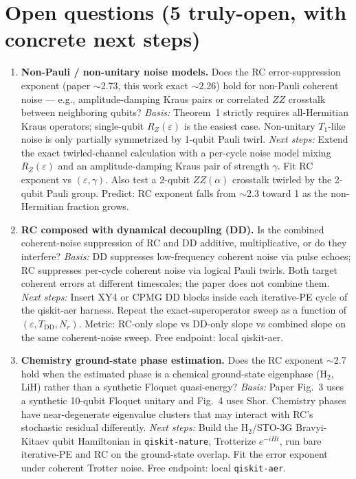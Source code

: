 \section*{Open questions (5 truly-open, with concrete next steps)}

\begin{enumerate}
  \item \textbf{Non-Pauli / non-unitary noise models.}
  Does the RC error-suppression exponent (paper $\sim$2.73, this work exact $\sim$2.26) hold for non-Pauli coherent noise --- e.g., amplitude-damping Kraus pairs or correlated $ZZ$ crosstalk between neighboring qubits?
  \emph{Basis:} Theorem~1 strictly requires all-Hermitian Kraus operators; single-qubit $R_Z(\varepsilon)$ is the easiest case. Non-unitary $T_1$-like noise is only partially symmetrized by 1-qubit Pauli twirl.
  \emph{Next steps:} Extend the exact twirled-channel calculation with a per-cycle noise model mixing $R_Z(\varepsilon)$ and an amplitude-damping Kraus pair of strength $\gamma$. Fit RC exponent vs $(\varepsilon,\gamma)$. Also test a 2-qubit $ZZ(\alpha)$ crosstalk twirled by the 2-qubit Pauli group. Predict: RC exponent falls from $\sim$2.3 toward 1 as the non-Hermitian fraction grows.

  \item \textbf{RC composed with dynamical decoupling (DD).}
  Is the combined coherent-noise suppression of RC and DD additive, multiplicative, or do they interfere?
  \emph{Basis:} DD suppresses low-frequency coherent noise via pulse echoes; RC suppresses per-cycle coherent noise via logical Pauli twirls. Both target coherent errors at different timescales; the paper does not combine them.
  \emph{Next steps:} Insert XY4 or CPMG DD blocks inside each iterative-PE cycle of the qiskit-aer harness. Repeat the exact-superoperator sweep as a function of $(\varepsilon, T_{\text{DD}}, N_r)$. Metric: RC-only slope vs DD-only slope vs combined slope on the same coherent-noise sweep. Free endpoint: local qiskit-aer.

  \item \textbf{Chemistry ground-state phase estimation.}
  Does the RC exponent $\sim$2.7 hold when the estimated phase is a chemical ground-state eigenphase (H$_2$, LiH) rather than a synthetic Floquet quasi-energy?
  \emph{Basis:} Paper Fig.~3 uses a synthetic 10-qubit Floquet unitary and Fig.~4 uses Shor. Chemistry phases have near-degenerate eigenvalue clusters that may interact with RC's stochastic residual differently.
  \emph{Next steps:} Build the H$_2$/STO-3G Bravyi-Kitaev qubit Hamiltonian in \texttt{qiskit-nature}, Trotterize $e^{-iHt}$, run bare iterative-PE and RC on the ground-state overlap. Fit the error exponent under coherent Trotter noise. Free endpoint: local \texttt{qiskit-aer}.


\end{enumerate}
